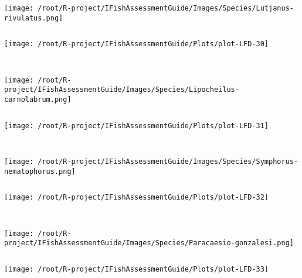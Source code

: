 \documentclass{report}\usepackage[]{graphicx}\usepackage[]{color}
\makeatletter
\def\maxwidth{ %
  \ifdim\Gin@nat@width>\linewidth
    \linewidth
  \else
    \Gin@nat@width
  \fi
}
\newenvironment{kframe}{%
 \def\at@end@of@kframe{}%
 \ifinner\ifhmode%
  \def\at@end@of@kframe{\end{minipage}}%
  \begin{minipage}{\columnwidth}%
 \fi\fi%
 \def\FrameCommand##1{\hskip\@totalleftmargin \hskip-\fboxsep
 \colorbox{shadecolor}{##1}\hskip-\fboxsep
     \hskip-\linewidth \hskip-\@totalleftmargin \hskip\columnwidth}%
 \MakeFramed {\advance\hsize-\width
   \@totalleftmargin\z@ \linewidth\hsize
   \@setminipage}}%
 {\par\unskip\endMakeFramed%
 \at@end@of@kframe}
\newenvironment{knitrout}{}{} %
\makeatother
\begin{document}
\begin{knitrout}
\begin{kframe}
\begin{verbatim}
\end{verbatim}
\end{kframe}
\texttt{[image: /root/R-project/IFishAssessmentGuide/Images/Species/Lutjanus-rivulatus.png]}
\begin{kframe}\begin{verbatim}
\end{verbatim}
\end{kframe}
\texttt{[image: /root/R-project/IFishAssessmentGuide/Plots/plot-LFD-30]} 
\begin{kframe}\begin{verbatim}
 
\end{verbatim}
\end{kframe}
\texttt{[image: /root/R-project/IFishAssessmentGuide/Images/Species/Lipocheilus-carnolabrum.png]}
\begin{kframe}\begin{verbatim}
\end{verbatim}
\end{kframe}
\texttt{[image: /root/R-project/IFishAssessmentGuide/Plots/plot-LFD-31]} 
\begin{kframe}\begin{verbatim}
 
\end{verbatim}
\end{kframe}
\texttt{[image: /root/R-project/IFishAssessmentGuide/Images/Species/Symphorus-nematophorus.png]}
\begin{kframe}\begin{verbatim}
\end{verbatim}
\end{kframe}
\texttt{[image: /root/R-project/IFishAssessmentGuide/Plots/plot-LFD-32]} 
\begin{kframe}\begin{verbatim}
 
\end{verbatim}
\end{kframe}
\texttt{[image: /root/R-project/IFishAssessmentGuide/Images/Species/Paracaesio-gonzalesi.png]}
\begin{kframe}\begin{verbatim}
\end{verbatim}
\end{kframe}
\texttt{[image: /root/R-project/IFishAssessmentGuide/Plots/plot-LFD-33]} 
\begin{kframe}\begin{verbatim}
 

\end{verbatim}
\end{kframe}
\end{knitrout}
\end{document}
